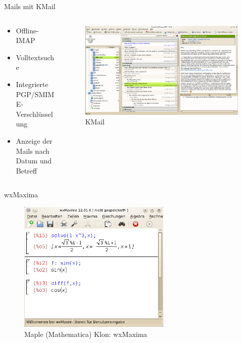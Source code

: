 \begin{frame}{Mails mit KMail}
  \begin{columns}
    \begin{column}{0.3\textwidth}
      \begin{itemize}
        \item Offline-IMAP
        \item Volltextsuche
        \item Integrierte PGP/SMIME-Verschlüsselung
        \item Anzeige der Mails nach Datum und Betreff
      \end{itemize}      
    \end{column}
    \begin{column}{0.7\textwidth}
      \begin{figure}
        \includegraphics[keepaspectratio=true,width=\textwidth]{kmail}
        \caption{KMail}
      \end{figure}
    \end{column}
  \end{columns}
\end{frame}

\begin{frame}{wxMaxima}
  \begin{figure}
    \includegraphics[keepaspectratio=true,width=0.65\textwidth]{wxmaxima}
    \caption{Maple (Mathematica) Klon: wxMaxima}
  \end{figure}
\end{frame}

